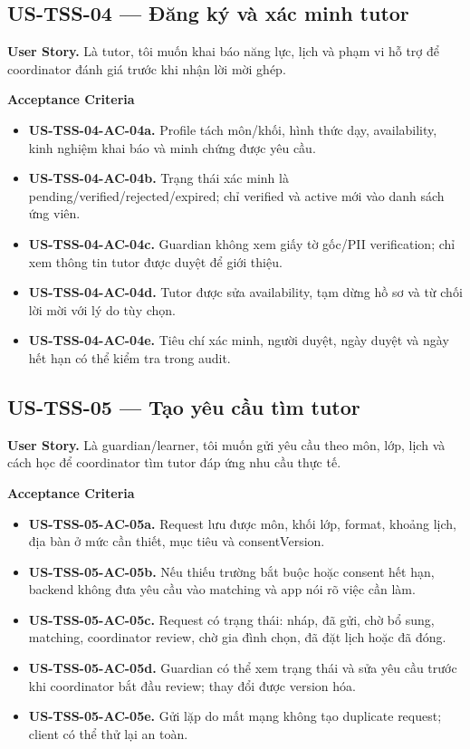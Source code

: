 \documentclass[11pt,a4paper]{article}
\newcommand{\ac}[1]{\textbf{\currentstory-AC-#1.}}
\newcommand{\storytitle}[2]{\subsection{#1 — #2}\def\currentstory{#1}}
\newcommand{\story}[1]{\textbf{User Story.} #1\par}
\newcommand{\acceptance}{\textbf{Acceptance Criteria}\par}
\begin{document}
\storytitle{US-TSS-04}{Đăng ký và xác minh tutor}
\story{Là tutor, tôi muốn khai báo năng lực, lịch và phạm vi hỗ trợ để coordinator đánh giá trước khi nhận lời mời ghép.}
\acceptance
\begin{itemize}
  \item \ac{04a} Profile tách môn/khối, hình thức dạy, availability, kinh nghiệm khai báo và minh chứng được yêu cầu.
  \item \ac{04b} Trạng thái xác minh là pending/verified/rejected/expired; chỉ verified và active mới vào danh sách ứng viên.
  \item \ac{04c} Guardian không xem giấy tờ gốc/PII verification; chỉ xem thông tin tutor được duyệt để giới thiệu.
  \item \ac{04d} Tutor được sửa availability, tạm dừng hồ sơ và từ chối lời mời với lý do tùy chọn.
  \item \ac{04e} Tiêu chí xác minh, người duyệt, ngày duyệt và ngày hết hạn có thể kiểm tra trong audit.
\end{itemize}

\storytitle{US-TSS-05}{Tạo yêu cầu tìm tutor}
\story{Là guardian/learner, tôi muốn gửi yêu cầu theo môn, lớp, lịch và cách học để coordinator tìm tutor đáp ứng nhu cầu thực tế.}
\acceptance
\begin{itemize}
  \item \ac{05a} Request lưu được môn, khối lớp, format, khoảng lịch, địa bàn ở mức cần thiết, mục tiêu và consentVersion.
  \item \ac{05b} Nếu thiếu trường bắt buộc hoặc consent hết hạn, backend không đưa yêu cầu vào matching và app nói rõ việc cần làm.
  \item \ac{05c} Request có trạng thái: nháp, đã gửi, chờ bổ sung, matching, coordinator review, chờ gia đình chọn, đã đặt lịch hoặc đã đóng.
  \item \ac{05d} Guardian có thể xem trạng thái và sửa yêu cầu trước khi coordinator bắt đầu review; thay đổi được version hóa.
  \item \ac{05e} Gửi lặp do mất mạng không tạo duplicate request; client có thể thử lại an toàn.
\end{itemize}
\end{document}
